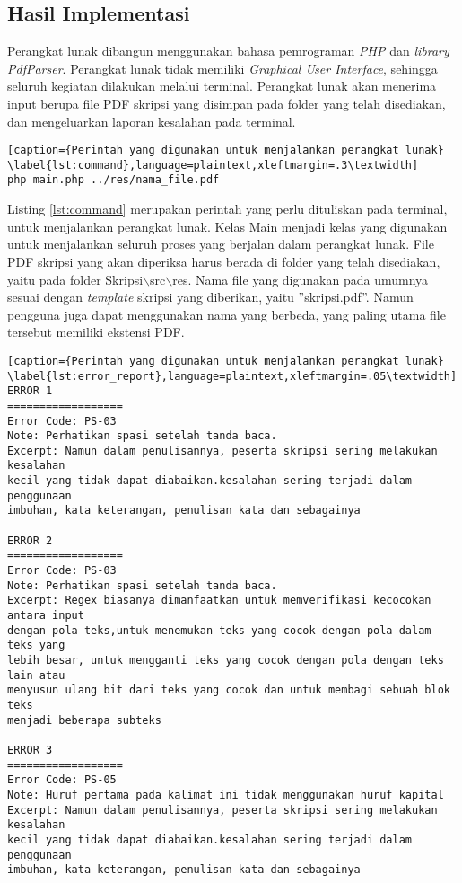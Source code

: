 \subsection{Hasil Implementasi}
Perangkat lunak dibangun menggunakan bahasa pemrograman \textit{PHP} dan \textit{library PdfParser}. Perangkat lunak tidak memiliki \textit{Graphical User Interface}, sehingga seluruh kegiatan dilakukan melalui terminal. Perangkat lunak akan menerima input berupa file PDF skripsi yang disimpan pada folder yang telah disediakan, dan mengeluarkan laporan kesalahan pada terminal.

\begin{lstlisting}[caption={Perintah yang digunakan untuk menjalankan perangkat lunak}	\label{lst:command},language=plaintext,xleftmargin=.3\textwidth] 
php main.php ../res/nama_file.pdf
\end{lstlisting}
\medskip

Listing \ref{lst:command} merupakan perintah yang perlu dituliskan pada terminal, untuk menjalankan perangkat lunak. Kelas Main menjadi kelas yang digunakan untuk menjalankan seluruh proses yang berjalan dalam perangkat lunak. File PDF skripsi yang akan diperiksa harus berada di folder yang telah disediakan, yaitu pada folder Skripsi$\backslash$src$\backslash$res. Nama file yang digunakan pada umumnya sesuai dengan \textit{template} skripsi yang diberikan, yaitu ''skripsi.pdf''. Namun pengguna juga dapat menggunakan nama yang berbeda, yang paling utama file tersebut memiliki ekstensi PDF.

\begin{lstlisting}[caption={Perintah yang digunakan untuk menjalankan perangkat lunak}	\label{lst:error_report},language=plaintext,xleftmargin=.05\textwidth] 
ERROR 1
==================
Error Code: PS-03
Note: Perhatikan spasi setelah tanda baca.
Excerpt: Namun dalam penulisannya, peserta skripsi sering melakukan kesalahan 
kecil yang tidak dapat diabaikan.kesalahan sering terjadi dalam penggunaan 
imbuhan, kata keterangan, penulisan kata dan sebagainya

ERROR 2
==================
Error Code: PS-03
Note: Perhatikan spasi setelah tanda baca.
Excerpt: Regex biasanya dimanfaatkan untuk memverifikasi kecocokan antara input 
dengan pola teks,untuk menemukan teks yang cocok dengan pola dalam teks yang 
lebih besar, untuk mengganti teks yang cocok dengan pola dengan teks lain atau 
menyusun ulang bit dari teks yang cocok dan untuk membagi sebuah blok teks
menjadi beberapa subteks

ERROR 3
==================
Error Code: PS-05
Note: Huruf pertama pada kalimat ini tidak menggunakan huruf kapital
Excerpt: Namun dalam penulisannya, peserta skripsi sering melakukan kesalahan
kecil yang tidak dapat diabaikan.kesalahan sering terjadi dalam penggunaan 
imbuhan, kata keterangan, penulisan kata dan sebagainya
\end{lstlisting}
\medskip

